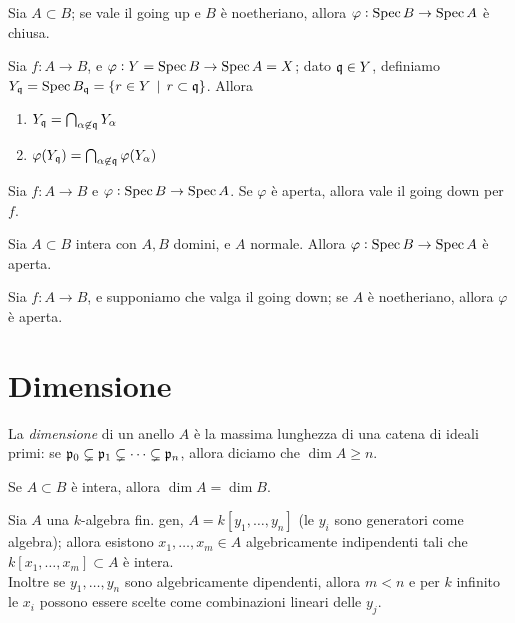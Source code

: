 \begin{proposition}
    Sia $A\subset B$; se vale il going up e $B$ è noetheriano, allora $\varphi:\operatorname{Spec} B\to\operatorname{Spec} A$ è chiusa.
\end{proposition}

\begin{lemma}
    Sia $f:A\to B$, e $\varphi:Y=\operatorname{Spec} B\to \operatorname{Spec} A=X$; dato $\mathfrak{q}\in Y$, definiamo $Y_{\mathfrak{q}} = \operatorname{Spec} B_{\mathfrak{q}} =\{ r\in Y \operatorname{\; |\;} r\subset \mathfrak{q} \}$. Allora
    \begin{enumerate}
        \item $Y_{\mathfrak{q}}=\bigcap_{\alpha\not\in \mathfrak{q}} Y_\alpha$
        \item $\varphi(Y_{\mathfrak{q}})=\bigcap_{\alpha\not\in \mathfrak{q}} \varphi(Y_\alpha)$
    \end{enumerate}
\end{lemma}

\begin{theorem}
    Sia $f:A\to B$ e $\varphi:\operatorname{Spec} B\to\operatorname{Spec} A$. Se $\varphi$ è aperta, allora vale il going down per $f$.
\end{theorem}

\begin{theorem}
    Sia $A\subset B$ intera con $A,B$ domini, e $A$ normale. Allora $\varphi:\operatorname{Spec} B\to\operatorname{Spec} A$ è aperta.
\end{theorem}

\begin{proposition}
    Sia $f:A\to B$, e supponiamo che valga il going down; se $A$ è noetheriano, allora $\varphi$ è aperta.
\end{proposition}


\section{Dimensione}

\begin{definition}
    La \emph{dimensione} di un anello $A$ è la massima lunghezza di una catena di ideali primi: se $\mathfrak{p}_0\subsetneq \mathfrak{p}_1\subsetneq\dots\subsetneq\mathfrak{p}_n$, allora diciamo che $\dim A\ge n$.
\end{definition}

\begin{proposition}
    Se $A\subset B$ è intera, allora $\dim A=\dim B$.
\end{proposition}

\begin{theorem}
    Sia $A$ una $k$-algebra fin. gen, $A=k[y_1,\dots,y_n]$ (le $y_i$ sono generatori come algebra); allora esistono $x_1,\dots,x_m\in A$ algebricamente indipendenti tali che $k[x_1,\dots,x_m]\subset A$ è intera.\\
    Inoltre se $y_1,\dots,y_n$ sono algebricamente dipendenti, allora $m<n$ e per $k$ infinito le $x_i$ possono essere scelte come combinazioni lineari delle $y_j$.
\end{theorem}

